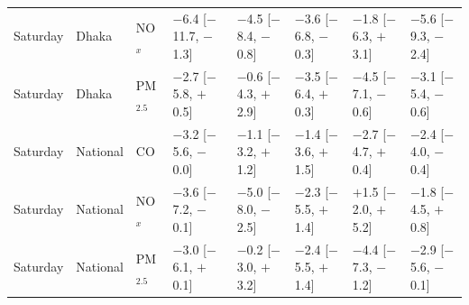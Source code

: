 \begin{longtable}{L{1.6cm} L{1.4cm} L{1.1cm} C{2.1cm} C{2.1cm} C{2.1cm} C{2.1cm} C{2.1cm}}
Saturday & Dhaka & NO$_x$ & $-$6.4 {\scriptsize[$-$11.7, $-$1.3]} & $-$4.5 {\scriptsize[$-$8.4, $-$0.8]} & $-$3.6 {\scriptsize[$-$6.8, $-$0.3]} & $-$1.8 {\scriptsize[$-$6.3, $+$3.1]} & $-$5.6 {\scriptsize[$-$9.3, $-$2.4]} \\
Saturday & Dhaka & PM$_{2.5}$ & $-$2.7 {\scriptsize[$-$5.8, $+$0.5]} & $-$0.6 {\scriptsize[$-$4.3, $+$2.9]} & $-$3.5 {\scriptsize[$-$6.4, $+$0.3]} & $-$4.5 {\scriptsize[$-$7.1, $-$0.6]} & $-$3.1 {\scriptsize[$-$5.4, $-$0.6]} \\
Saturday & National & CO & $-$3.2 {\scriptsize[$-$5.6, $-$0.0]} & $-$1.1 {\scriptsize[$-$3.2, $+$1.2]} & $-$1.4 {\scriptsize[$-$3.6, $+$1.5]} & $-$2.7 {\scriptsize[$-$4.7, $+$0.4]} & $-$2.4 {\scriptsize[$-$4.0, $-$0.4]} \\
Saturday & National & NO$_x$ & $-$3.6 {\scriptsize[$-$7.2, $-$0.1]} & $-$5.0 {\scriptsize[$-$8.0, $-$2.5]} & $-$2.3 {\scriptsize[$-$5.5, $+$1.4]} & $+$1.5 {\scriptsize[$-$2.0, $+$5.2]} & $-$1.8 {\scriptsize[$-$4.5, $+$0.8]} \\
Saturday & National & PM$_{2.5}$ & $-$3.0 {\scriptsize[$-$6.1, $+$0.1]} & $-$0.2 {\scriptsize[$-$3.0, $+$3.2]} & $-$2.4 {\scriptsize[$-$5.5, $+$1.4]} & $-$4.4 {\scriptsize[$-$7.3, $-$1.2]} & $-$2.9 {\scriptsize[$-$5.6, $-$0.1]} \\
\end{longtable}
\endgroup
